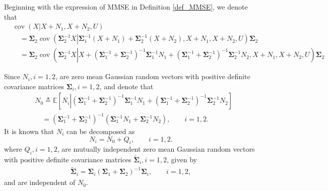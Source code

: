 \documentclass[journal,final, onecolumn]{IEEEtran}
\DeclareMathOperator{\cov}{cov}
\begin{document}
\begin{IEEEproof}
Beginning with the expression of MMSE in Definition \ref{def_MMSE}, we denote that
\begin{align}
& \cov(X|X+N_{1},X+N_{2},U)  \nonumber \\
&\quad= \boldsymbol{\Sigma}_{2}\cov \left( \boldsymbol{\Sigma}_{2}^{-1} X \left| \boldsymbol{\Sigma}_{1}^{-1} (X+N_{1}) + \boldsymbol{\Sigma}_{2}^{-1} (X+N_{2}), X+N_{1},X+N_{2},U \right.\right)\boldsymbol{\Sigma}_{2}\\
&\quad= \boldsymbol{\Sigma}_{2} \cov \left( \boldsymbol{\Sigma}_{2}^{-1} X \left| X + \left( \boldsymbol{\Sigma}_{1}^{-1} + \boldsymbol{\Sigma}_{2}^{-1}\right)^{-1}   \boldsymbol{\Sigma}_{1}^{-1} N_{1} +  \left(  \boldsymbol{\Sigma}_{1}^{-1} + \boldsymbol{\Sigma}_{2}^{-1}\right)^{-1}   \boldsymbol{\Sigma}_{2}^{-1} N_{2} , X+N_{1},X+N_{2},U \right. \right)\boldsymbol{\Sigma}_{2}\label{eq_cov}
\end{align}

Since $N_{i}, i=1,2$, are zero mean Gaussian random vectors with positive definite covariance matrices $\boldsymbol{\Sigma}_{i}, i=1,2$, and denote that
\begin{align}
&{N}_{0} \triangleq \mathbb{E}\left[ N_{i}           \left|  \left( \boldsymbol{\Sigma}_{1}^{-1} + \boldsymbol{\Sigma}_{2}^{-1}\right)^{-1}   \boldsymbol{\Sigma}_{1}^{-1} N_{1} +  \left(  \boldsymbol{\Sigma}_{1}^{-1} + \boldsymbol{\Sigma}_{2}^{-1}\right)^{-1}   \boldsymbol{\Sigma}_{2}^{-1} N_{2} \right. \right] \nonumber \\
&\quad = \left( \boldsymbol{\Sigma}_{1}^{-1} + \boldsymbol{\Sigma}_{2}^{-1}\right)^{-1} \left(  \boldsymbol{\Sigma}_{1}^{-1} N_{1} +    \boldsymbol{\Sigma}_{2}^{-1} N_{2} \right), \qquad i=1,2.
\end{align}
It is known that $N_{i}$ can be decomposed as
\begin{equation}
N_{i}= {N}_{0} + Q_{i}, \qquad i=1,2.
\end{equation}
where $Q_{i}, i=1,2$, are mutually independent zero mean Gaussian random vectors with positive definite covariance matrices $\tilde{\boldsymbol{\Sigma}}_{i}, i=1,2$, given by
\begin{align}
\tilde{\boldsymbol{\Sigma}}_{i}=\boldsymbol{\Sigma}_{i}  \left( \boldsymbol{\Sigma}_{1} + \boldsymbol{\Sigma}_{2}\right)^{-1}\boldsymbol{\Sigma}_{i},  \qquad i=1,2,
\end{align}
and are independent of ${N}_{0}$.



\end{IEEEproof}
\end{document}
